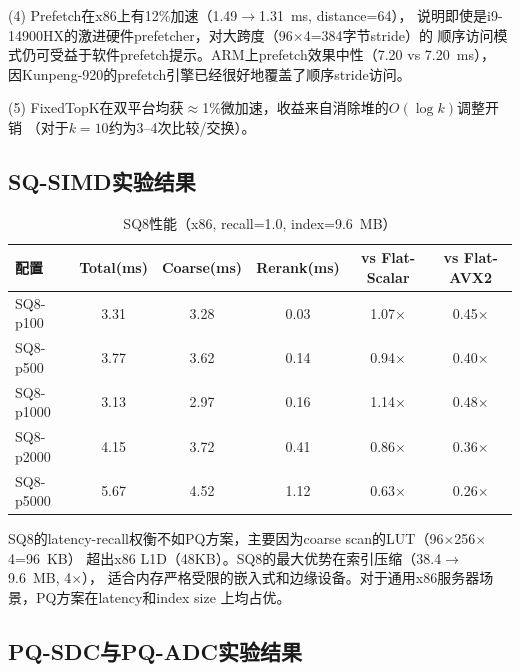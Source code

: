 \documentclass[11pt,a4paper]{article}
\begin{document}
(4) Prefetch在x86上有12\%加速（1.49$\to$1.31~ms, distance=64），
说明即使是i9-14900HX的激进硬件prefetcher，对大跨度（96$\times$4=384字节stride）的
顺序访问模式仍可受益于软件prefetch提示。ARM上prefetch效果中性（7.20 vs 7.20~ms），
因Kunpeng-920的prefetch引擎已经很好地覆盖了顺序stride访问。

(5) FixedTopK在双平台均获$\approx$1\%微加速，收益来自消除堆的$O(\log k)$调整开销
（对于$k=10$约为3--4次比较/交换）。

\subsection{SQ-SIMD实验结果}

\begin{table}[H]
\centering
\caption{SQ8性能（x86, recall=1.0, index=9.6~MB）}
\label{tab:sq}
\small
\begin{tabular}{lccccc}
\toprule
\textbf{配置} & \textbf{Total(ms)} & \textbf{Coarse(ms)} & \textbf{Rerank(ms)} & \textbf{vs Flat-Scalar} & \textbf{vs Flat-AVX2} \\
\midrule
SQ8-p100  & 3.31 & 3.28 & 0.03 & 1.07$\times$ & 0.45$\times$ \\
SQ8-p500  & 3.77 & 3.62 & 0.14 & 0.94$\times$ & 0.40$\times$ \\
SQ8-p1000 & 3.13 & 2.97 & 0.16 & 1.14$\times$ & 0.48$\times$ \\
SQ8-p2000 & 4.15 & 3.72 & 0.41 & 0.86$\times$ & 0.36$\times$ \\
SQ8-p5000 & 5.67 & 4.52 & 1.12 & 0.63$\times$ & 0.26$\times$ \\
\bottomrule
\end{tabular}
\end{table}

SQ8的latency-recall权衡不如PQ方案，主要因为coarse scan的LUT（96$\times$256$\times$4=96~KB）
超出x86 L1D（48KB）。SQ8的最大优势在索引压缩（38.4$\to$9.6~MB, 4$\times$），
适合内存严格受限的嵌入式和边缘设备。对于通用x86服务器场景，PQ方案在latency和index size
上均占优。

\subsection{PQ-SDC与PQ-ADC实验结果}
\end{document}
